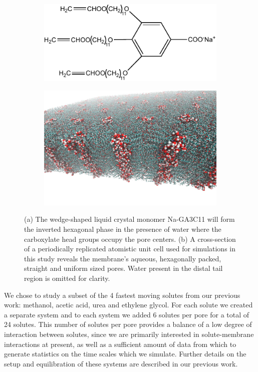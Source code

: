 \documentclass{article}
\begin{document}
  \begin{figure}
  \centering
  \begin{subfigure}{0.4\textwidth}
  \centering
  \includegraphics[width=\textwidth]{NaGA3C11.pdf}
  \caption{}\label{fig:monomer_structure}
  \end{subfigure}
  \begin{subfigure}{0.5\textwidth}
  \centering
  \includegraphics[width=\textwidth]{membrane_profile.pdf}
  \caption{}\label{fig:membrane_profile}
  \end{subfigure}
  \caption{(a) The wedge-shaped liquid crystal monomer Na-GA3C11 will form the inverted
  hexagonal phase in the presence of water where the carboxylate head groups occupy the
  pore centers. (b) A cross-section of a periodically replicated atomistic unit cell 
  used for simulations in this study reveals the membrane's aqueous, hexagonally packed,
  straight and uniform sized pores. Water present in the distal tail region is omitted 
  for clarity.}\label{fig:membrane_structure}
  \end{figure}
  
  We chose to study a subset of the 4 fastest moving solutes from our previous
  work: methanol, acetic acid, urea and ethylene glycol. For each solute we 
  created a separate system and to each system we added 6 solutes per pore 
  for a total of 24 solutes. This number of solutes per pore provides a balance
  of a low degree of interaction between solutes, since we are primarily interested 
  in solute-membrane interactions at present, as well as a sufficient amount of 
  data from which to generate statistics on the time scales which we simulate.
  Further details on the setup and equilibration of these systems are described in
  our previous work.\cite{coscia_chemically_2019}
  
\end{document}
